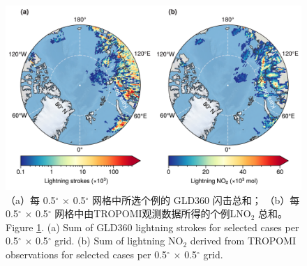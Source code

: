 \begin{figure}[!htbp]
\centering
\includegraphics[width=13cm]{./figures/arctic_lno2_production.png}
\caption{
（a）每 0.5$^{\circ}$ $\times$ 0.5$^{\circ}$ 网格中所选个例的 GLD360 闪击总和；
（b）每 0.5$^{\circ}$ $\times$ 0.5$^{\circ}$ 网格中由TROPOMI观测数据所得的个例LNO$_2$ 总和。\\
Figure \ref{fig:arctic_lno2_production}. (a) Sum of GLD360 lightning strokes for selected cases per 0.5$^{\circ}$ $\times$ 0.5$^{\circ}$ grid.
(b) Sum of lightning NO$_2$ derived from TROPOMI observations for selected cases per 0.5$^{\circ}$ $\times$ 0.5$^{\circ}$ grid.
}
\label{fig:arctic_lno2_production}
\end{figure}

